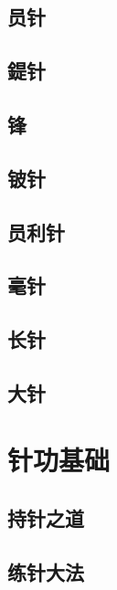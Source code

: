 \documentclass[
]{book}
\begin{document}
\subsection{员针}\label{ux5458ux9488}

\subsection{鍉针}\label{ux9349ux9488}

\subsection{锋}\label{ux950b}

\subsection{铍针}\label{ux94cdux9488}

\subsection{员利针}\label{ux5458ux5229ux9488}

\subsection{毫针}\label{ux6bebux9488}

\subsection{长针}\label{ux957fux9488}

\subsection{大针}\label{ux5927ux9488}

\section{针功基础}\label{ux9488ux529fux57faux7840}

\subsection{持针之道}\label{ux6301ux9488ux4e4bux9053}

\subsection{练针大法}\label{ux7ec3ux9488ux5927ux6cd5}
\end{document}
